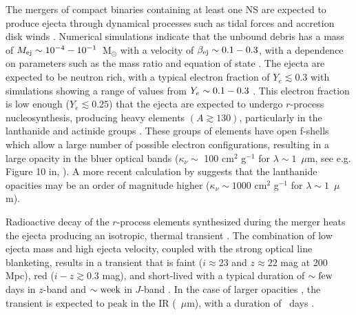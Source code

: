 The mergers of compact binaries containing at least one NS are expected to produce ejecta through dynamical processes such as tidal forces and accretion disk winds \citep{Goriely+11,Bauswein+13a,Fernandez+15,Radice+16,Metzger2017,SiegelMetzger17}. Numerical simulations indicate that the unbound debris has a mass of $M_{\rm ej} \sim 10^{-4} - 10^{-1}$~M$_{\odot}$ with a velocity of $\beta_{\rm ej} \sim 0.1 - 0.3$, with a dependence on parameters such as the mass ratio and equation of state \citep{Hotokezaka+13,Tanaka+14,Kyutoku+15}. The ejecta are expected to be neutron rich, with a typical electron fraction of $Y_e \lesssim 0.3$ with simulations showing a range of values from $Y_e \sim 0.1 - 0.3$ \citep{Goriely+11,Bauswein+13a,Sekiguchi+15, Radice+16,SiegelMetzger17}. This electron fraction is low enough ($Y_e \lesssim 0.25$) that the ejecta are expected to undergo $r$-process nucleosynthesis, producing heavy elements $(A \gtrsim 130)$, particularly in the lanthanide and actinide groups \citep{Goriely+11,Bauswein+13a,SiegelMetzger17}. These groups of elements have open f-shells which allow a large number of possible electron configurations, resulting in a large opacity in the bluer optical bands ($\kappa_{\nu} \sim$ 100 cm$^2$ g$^{-1}$ for $\lambda \sim 1$~$\mu$m, see e.g. Figure 10 in, \citealt{Kasen+13}). A more recent calculation by \cite{Fontes+17} suggests that the lanthanide opacities may be an order of magnitude higher ($\kappa_{\nu} \sim 1000$  cm$^2$ g$^{-1}$ for $\lambda \sim 1$~$\mu$m).

Radioactive decay of the $r$-process elements synthesized during the merger heats the ejecta producing an isotropic, thermal transient \citep{LP98,Rosswog2005, Metzger+10,Tanaka+14,Metzger2017}. The combination of low ejecta mass and high ejecta velocity, coupled with the strong optical line blanketing, results in a transient that is faint ($i \approx 23$ and $z \approx 22$ mag at 200 Mpc), red ($i-z \gtrsim 0.3$ mag), and short-lived with a typical duration of $\sim {\rm few}$ days in $z$-band and $\sim{\rm week}$ in $J$-band \citep{BarnesKasen13,Barnes+16,Metzger2017}. In the case of larger opacities \citep[e.g.,][]{Fontes+17}, the transient is expected to peak in the IR (~$\mu$m), with a duration of ~days \citep{Fontes+17,Wollaeger+17}.

